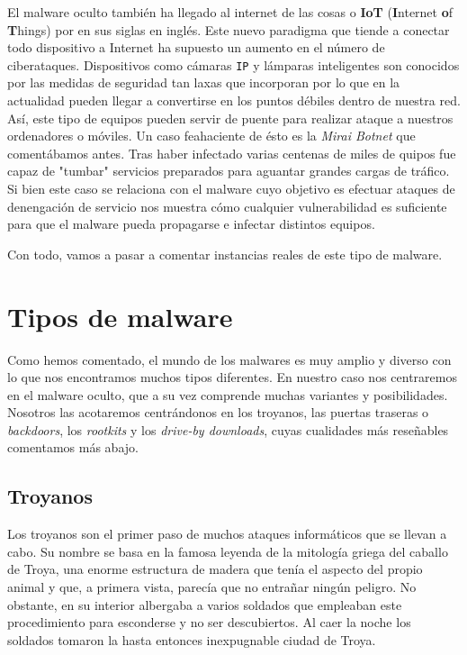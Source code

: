\documentclass[12pt]{article}
\newcommand{\newpar} {
    \vskip 1cm
}
\begin{document}
            \newpar

            El malware oculto también ha llegado al internet de las cosas o \textbf{IoT} (\textbf{I}nternet \textbf{o}f \textbf{T}hings) por en sus siglas en inglés. Este nuevo paradigma que tiende a conectar todo dispositivo a Internet ha supuesto un aumento en el número de ciberataques. Dispositivos como cámaras \texttt{IP} y lámparas inteligentes son conocidos por las medidas de seguridad tan laxas que incorporan por lo que en la actualidad pueden llegar a convertirse en los puntos débiles dentro de nuestra red. Así, este tipo de equipos pueden servir de puente para realizar ataque a nuestros ordenadores o móviles. Un caso feahaciente de ésto es la \textit{Mirai Botnet} que comentábamos antes. Tras haber infectado varias centenas de miles de quipos fue capaz de "tumbar" servicios preparados para aguantar grandes cargas de tráfico. Si bien este caso se relaciona con el malware cuyo objetivo es efectuar ataques de denengación de servicio nos muestra cómo cualquier vulnerabilidad es suficiente para que el malware pueda propagarse e infectar distintos equipos.

            \newpar

            Con todo, vamos a pasar a comentar instancias reales de este tipo de malware.

    \section{Tipos de malware}
    Como hemos comentado, el mundo de los malwares es muy amplio y diverso con lo que nos encontramos muchos tipos diferentes. En nuestro caso nos centraremos en el malware oculto, que a su vez comprende muchas variantes y posibilidades. Nosotros las acotaremos centrándonos en los troyanos, las puertas traseras o \textit{backdoors}, los \textit{rootkits} y los \textit{drive-by downloads}, cuyas cualidades más reseñables comentamos más abajo.

        \subsection{Troyanos}
            Los troyanos son el primer paso de muchos ataques informáticos que se llevan a cabo. Su nombre se basa en la famosa leyenda de la mitología griega del caballo de Troya, una enorme estructura de madera que tenía el aspecto del propio animal y que, a primera vista, parecía que no entrañar ningún peligro. No obstante, en su interior albergaba a varios soldados que empleaban este procedimiento para esconderse y no ser descubiertos. Al caer la noche los soldados tomaron la hasta entonces inexpugnable ciudad de Troya.
\end{document}
